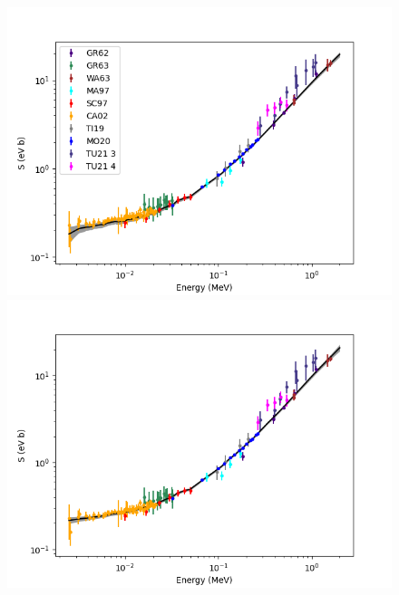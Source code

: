 \documentclass[%
 reprint,
superscriptaddress,
nofootinbib,
 amsmath,amssymb,
 aps,
 pra,
]{revtex4-2}
\begin{document}
\begin{figure}
    	\centering
    	\begin{minipage}{.48\textwidth}
        		\centering
        		\includegraphics[width=\linewidth]{Figures/dphe3g_S.png}
    	\end{minipage}
    	\hspace{0mm}
    	\begin{minipage}{.48\textwidth}
        		\centering
        		\includegraphics[width=\linewidth]{Figures/dphe3g_logS.png}
    	\end{minipage}
    	\begin{minipage}{.48\textwidth}
    		\centering

\end{minipage}
\end{figure}
\end{document}
